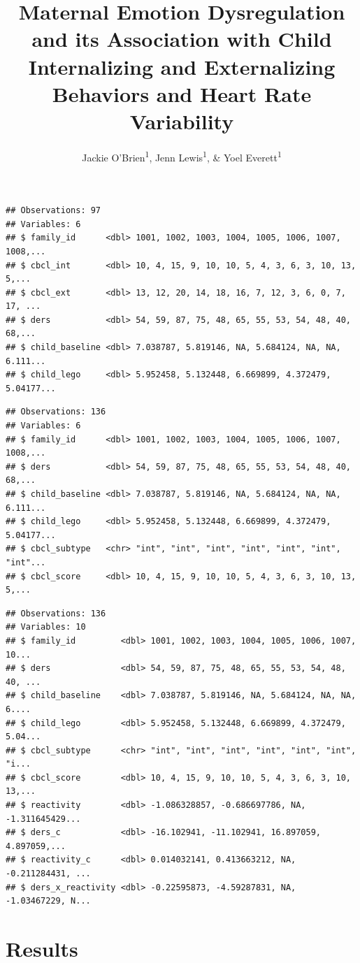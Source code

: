 \documentclass[man]{apa6}
\title{Maternal Emotion Dysregulation and its Association with Child
Internalizing and Externalizing Behaviors and Heart Rate Variability}
\author{Jackie O'Brien\textsuperscript{1}, Jenn Lewis\textsuperscript{1}, \&
Yoel Everett\textsuperscript{1}}
\date{}
\affiliation{
\vspace{0.5cm}
\textsuperscript{1} University of Oregon}
\begin{document}
\maketitle

\begin{verbatim}
## Observations: 97
## Variables: 6
## $ family_id      <dbl> 1001, 1002, 1003, 1004, 1005, 1006, 1007, 1008,...
## $ cbcl_int       <dbl> 10, 4, 15, 9, 10, 10, 5, 4, 3, 6, 3, 10, 13, 5,...
## $ cbcl_ext       <dbl> 13, 12, 20, 14, 18, 16, 7, 12, 3, 6, 0, 7, 17, ...
## $ ders           <dbl> 54, 59, 87, 75, 48, 65, 55, 53, 54, 48, 40, 68,...
## $ child_baseline <dbl> 7.038787, 5.819146, NA, 5.684124, NA, NA, 6.111...
## $ child_lego     <dbl> 5.952458, 5.132448, 6.669899, 4.372479, 5.04177...
\end{verbatim}

\begin{verbatim}
## Observations: 136
## Variables: 6
## $ family_id      <dbl> 1001, 1002, 1003, 1004, 1005, 1006, 1007, 1008,...
## $ ders           <dbl> 54, 59, 87, 75, 48, 65, 55, 53, 54, 48, 40, 68,...
## $ child_baseline <dbl> 7.038787, 5.819146, NA, 5.684124, NA, NA, 6.111...
## $ child_lego     <dbl> 5.952458, 5.132448, 6.669899, 4.372479, 5.04177...
## $ cbcl_subtype   <chr> "int", "int", "int", "int", "int", "int", "int"...
## $ cbcl_score     <dbl> 10, 4, 15, 9, 10, 10, 5, 4, 3, 6, 3, 10, 13, 5,...
\end{verbatim}

\begin{verbatim}
## Observations: 136
## Variables: 10
## $ family_id         <dbl> 1001, 1002, 1003, 1004, 1005, 1006, 1007, 10...
## $ ders              <dbl> 54, 59, 87, 75, 48, 65, 55, 53, 54, 48, 40, ...
## $ child_baseline    <dbl> 7.038787, 5.819146, NA, 5.684124, NA, NA, 6....
## $ child_lego        <dbl> 5.952458, 5.132448, 6.669899, 4.372479, 5.04...
## $ cbcl_subtype      <chr> "int", "int", "int", "int", "int", "int", "i...
## $ cbcl_score        <dbl> 10, 4, 15, 9, 10, 10, 5, 4, 3, 6, 3, 10, 13,...
## $ reactivity        <dbl> -1.086328857, -0.686697786, NA, -1.311645429...
## $ ders_c            <dbl> -16.102941, -11.102941, 16.897059, 4.897059,...
## $ reactivity_c      <dbl> 0.014032141, 0.413663212, NA, -0.211284431, ...
## $ ders_x_reactivity <dbl> -0.22595873, -4.59287831, NA, -1.03467229, N...
\end{verbatim}

\section{Results}\label{results}
\end{document}
